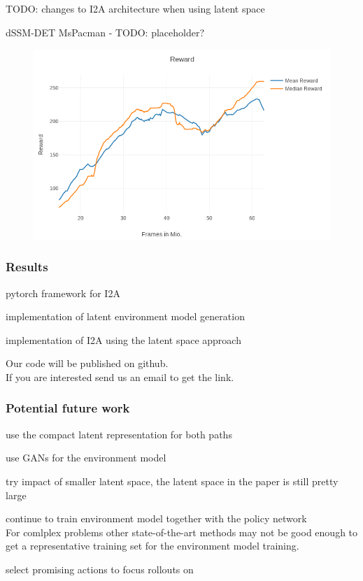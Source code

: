 \begin{frame}
TODO: changes to I2A architecture when using latent space
\end{frame}

\begin{frame}{dSSM-DET MsPacman - TODO: placeholder?}
    \begin{figure}
        \centering
        \includegraphics[width=\textwidth]{./latent_i2a_images/dSSM_DET_MsPacman.png}
    \end{figure}
\end{frame}


\begin{frame}
	\frametitle{Results}
	\begin{PraesentationAufzaehlung}
		\item pytorch framework for I2A
		\item implementation of latent environment model generation
		\item implementation of I2A using the latent space approach
	\end{PraesentationAufzaehlung}
	
	\bigskip
	Our code will be published on github.\\
	If you are interested send us an email to get the link.
\end{frame}


\begin{frame}
	\frametitle{Potential future work}
	\begin{PraesentationAufzaehlung}
		\item use the compact latent representation for both paths
	\item use GANs for the environment model
	\item try impact of smaller latent space, the latent space in the paper is still pretty large
	
	\item continue to train environment model together with the policy network\\
	For comlplex problems other state-of-the-art methods may not be good enough to get a representative training set for the environment model training.
	\item select promising actions to focus rollouts on
	\end{PraesentationAufzaehlung}
\end{frame}

